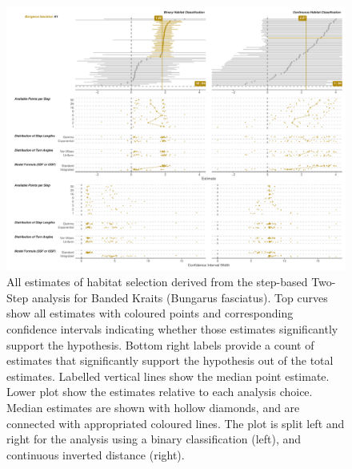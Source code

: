 \documentclass[10pt,a4paper]{article}
\begin{document}
\begin{figure}
\includegraphics[width=1\linewidth]{../../figures/specCurve_Bungarus fasciatus_twoStep} \caption{All estimates of habitat selection derived from the step-based Two-Step analysis for Banded Kraits (Bungarus fasciatus). Top curves show all estimates with coloured points and corresponding confidence intervals indicating whether those estimates significantly support the hypothesis. Bottom right labels provide a count of estimates that significantly support the hypothesis out of the total estimates. Labelled vertical lines show the median point estimate. Lower plot show the estimates relative to each analysis choice. Median estimates are shown with hollow diamonds, and are connected with appropriated coloured lines. The plot is split left and right for the analysis using a binary classification (left), and continuous inverted distance (right).}\label{fig:specCurveTwoStepBUFA}
\end{figure}
\end{document}
